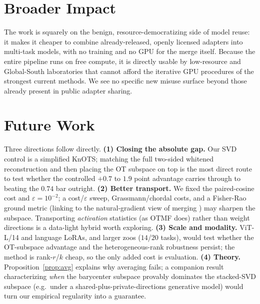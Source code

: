 \documentclass[11pt]{article}
\begin{document}
\section{Broader Impact}
\label{sec:impact}
The work is squarely on the benign, resource-democratizing side of model reuse: it makes it cheaper to
combine already-released, openly licensed adapters into multi-task models, with no training and no GPU
for the merge itself. Because the entire pipeline runs on free compute, it is directly usable by
low-resource and Global-South laboratories that cannot afford the iterative GPU procedures of the
strongest current methods. We see no specific new misuse surface beyond those already present in public
adapter sharing.

\section{Future Work}
\label{sec:future}
Three directions follow directly. \textbf{(1) Closing the absolute gap.} Our SVD control is a simplified
KnOTS; matching the full two-sided whitened reconstruction and then placing the OT subspace on top is the
most direct route to test whether the controlled $+0.7$ to $1.9$ point advantage carries through to beating
the $0.74$ bar outright. \textbf{(2) Better transport.} We fixed the paired-cosine cost and
$\varepsilon=10^{-2}$; a cost/$\varepsilon$ sweep, Grassmann/chordal costs, and a Fisher-Rao ground
metric (linking to the natural-gradient view of merging \citep{amari1998natural,matena2022fisher}) may
sharpen the subspace. Transporting \emph{activation} statistics (as OTMF \citep{pan2025otmf} does) rather
than weight directions is a data-light hybrid worth exploring. \textbf{(3) Scale and modality.} ViT-L/14
and language LoRAs, and larger zoos ($14$/$20$ tasks), would test whether the OT-subspace advantage and
the heterogeneous-rank robustness persist; the method is rank-$r$/$k$ cheap, so the only added cost is
evaluation. \textbf{(4) Theory.} Proposition~\ref{prop:avg} explains why averaging fails; a companion
result characterizing \emph{when} the barycenter subspace provably dominates the stacked-SVD subspace
(e.g.\ under a shared-plus-private-directions generative model) would turn our empirical regularity into
a guarantee.

\end{document}
